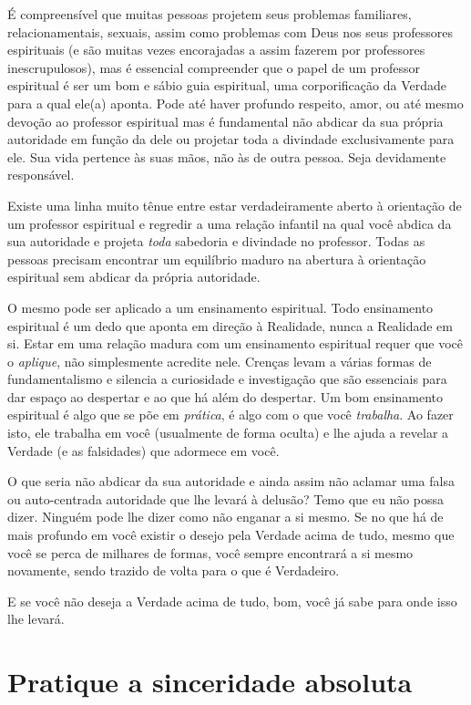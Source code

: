 É compreensível que muitas pessoas projetem seus problemas familiares, relacionamentais, sexuais, assim como problemas com Deus nos seus professores espirituais (e são muitas vezes encorajadas a assim fazerem por professores inescrupulosos), mas é essencial compreender que o papel de um professor espiritual é ser um bom e sábio guia espiritual, uma corporificação da Verdade para a qual ele(a) aponta. Pode até haver profundo respeito, amor, ou até mesmo devoção ao professor espiritual mas é fundamental não abdicar da sua própria autoridade em função da dele ou projetar toda a divindade exclusivamente para ele. Sua vida pertence às suas mãos, não às de outra pessoa. Seja devidamente responsável.

Existe uma linha muito tênue entre estar verdadeiramente aberto à orientação de um professor espiritual e regredir a uma relação infantil na qual você abdica da sua autoridade e projeta \emph{toda} sabedoria e divindade no professor. Todas as pessoas precisam encontrar um equilíbrio maduro na abertura à orientação espiritual sem abdicar da própria autoridade.

O mesmo pode ser aplicado a um ensinamento espiritual. Todo ensinamento espiritual é um dedo que aponta em direção à Realidade, nunca a Realidade em si. Estar em uma relação madura com um ensinamento espiritual requer que você o \emph{aplique}, não simplesmente acredite nele. Crenças levam a várias formas de fundamentalismo e silencia a curiosidade e investigação que são essenciais para dar espaço ao despertar e ao que há além do despertar. Um bom ensinamento espiritual é algo que se põe em \emph{prática}, é algo com o que você \emph{trabalha}. Ao fazer isto, ele trabalha em você (usualmente de forma oculta) e lhe ajuda a revelar a Verdade (e as falsidades) que adormece em você.

O que seria não abdicar da sua autoridade e ainda assim não aclamar uma falsa ou auto-centrada autoridade que lhe levará à delusão? Temo que eu não possa dizer. Ninguém pode lhe dizer como não enganar a si mesmo. Se no que há de mais profundo em você existir o desejo pela Verdade acima de tudo, mesmo que você se perca de milhares de formas, você sempre encontrará a si mesmo novamente, sendo trazido de volta para o que é Verdadeiro.

E se você não deseja a Verdade acima de tudo, bom, você já sabe para onde isso lhe levará.

\section*{Pratique a sinceridade absoluta}

